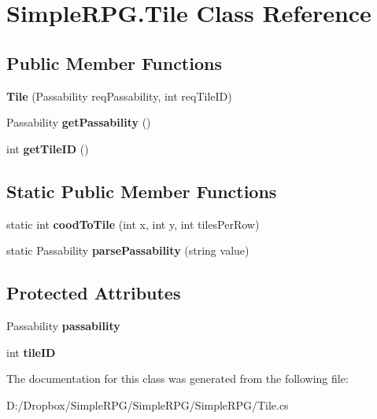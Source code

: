 \hypertarget{class_simple_r_p_g_1_1_tile}{\section{Simple\+R\+P\+G.\+Tile Class Reference}
\label{class_simple_r_p_g_1_1_tile}
}
\subsection*{Public Member Functions}
\begin{DoxyCompactItemize}
\item 
\hypertarget{class_simple_r_p_g_1_1_tile_a069f215130a286a98934195b2202a6db}{{\bfseries Tile} (Passability req\+Passability, int req\+Tile\+I\+D)}\label{class_simple_r_p_g_1_1_tile_a069f215130a286a98934195b2202a6db}

\item 
\hypertarget{class_simple_r_p_g_1_1_tile_abbdfa6a9bf0934cca5258a5ff856c2af}{Passability {\bfseries get\+Passability} ()}\label{class_simple_r_p_g_1_1_tile_abbdfa6a9bf0934cca5258a5ff856c2af}

\item 
\hypertarget{class_simple_r_p_g_1_1_tile_acc379dfbc9f1aacd7c369de976fb187c}{int {\bfseries get\+Tile\+I\+D} ()}\label{class_simple_r_p_g_1_1_tile_acc379dfbc9f1aacd7c369de976fb187c}

\end{DoxyCompactItemize}
\subsection*{Static Public Member Functions}
\begin{DoxyCompactItemize}
\item 
\hypertarget{class_simple_r_p_g_1_1_tile_a805019ccad915c5cd48743ae21aec5f4}{static int {\bfseries cood\+To\+Tile} (int x, int y, int tiles\+Per\+Row)}\label{class_simple_r_p_g_1_1_tile_a805019ccad915c5cd48743ae21aec5f4}

\item 
\hypertarget{class_simple_r_p_g_1_1_tile_a049b7bb8fc5d27983eb8533ae34c4968}{static Passability {\bfseries parse\+Passability} (string value)}\label{class_simple_r_p_g_1_1_tile_a049b7bb8fc5d27983eb8533ae34c4968}

\end{DoxyCompactItemize}
\subsection*{Protected Attributes}
\begin{DoxyCompactItemize}
\item 
\hypertarget{class_simple_r_p_g_1_1_tile_a8d68c342f4626a31c30910751438af0f}{Passability {\bfseries passability}}\label{class_simple_r_p_g_1_1_tile_a8d68c342f4626a31c30910751438af0f}

\item 
\hypertarget{class_simple_r_p_g_1_1_tile_ad7fb73f618a270d551b509c4f76ad0f2}{int {\bfseries tile\+I\+D}}\label{class_simple_r_p_g_1_1_tile_ad7fb73f618a270d551b509c4f76ad0f2}

\end{DoxyCompactItemize}


The documentation for this class was generated from the following file\+:\begin{DoxyCompactItemize}
\item 
D\+:/\+Dropbox/\+Simple\+R\+P\+G/\+Simple\+R\+P\+G/\+Simple\+R\+P\+G/Tile.\+cs\end{DoxyCompactItemize}
